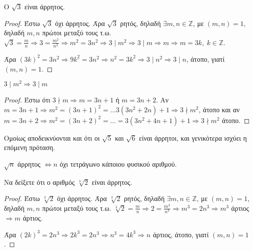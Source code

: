 \begin{example}
  Ο $ \sqrt{3} $ είναι άρρητος.
\end{example}

\begin{proof}
  Έστω $ \sqrt{3} $ όχι άρρητος. Άρα $ \sqrt{3} $ ρητός, δηλαδή $ \exists m,n 
  \in \mathbb{Z} $, με $ (m,n)=1 $, δηλαδή $ m,n $ πρώτοι μεταξύ τους
  τ.ω. $ \sqrt{3} = \frac{m}{n} \Rightarrow 3 = \frac{m^{2}}{n^{2}} \Rightarrow 
  m^{2} = 3n^{2} \Rightarrow 3 \mid m^{2} \Rightarrow 3 \mid m  \Rightarrow m 
  \Rightarrow m = 3k, \; k \in \mathbb{Z}$. 

  Άρα $ (3k)^{2} = 3n^{2} \Rightarrow 9k^{2}=3n^{2} \Rightarrow n^{2} = 3k^{2} 
  \Rightarrow 3 \mid n^{2} \Rightarrow  3 \mid n$,  άτοπο, γιατί $ (m,n)=1 $.
\end{proof}

\begin{lem}
  $ 3 \mid m^{2} \Rightarrow 3 \mid m $
\end{lem}

\begin{proof}
  Έστω ότι $ 3 \nmid m \Rightarrow m = 3n +1 $ ή $ m = 3n+2 $. 
  Αν $ m=3n+1 \Rightarrow m^{2} = (3n+1)^{2} = \ldots 3(3n^{2}+2n)+1 \Rightarrow 
  3 \nmid m^{2}$, άτοπο και αν $ m =3n+2 \Rightarrow m^{2}=(3n+2)^{2} = \ldots = 
  3(3n^{2}+4n+1)+1 \Rightarrow 3 \nmid m^{2}$ άτοπο.
\end{proof}

\begin{rem}
  Ομοίως αποδεικνύονται και ότι οι $ \sqrt{5}$ και  $ \sqrt{6} $ είναι άρρητοι, 
  και γενικότερα ισχύει η επόμενη πρόταση.
\end{rem}

\begin{mybox3}
\begin{prop}
  $ \sqrt{n} $ άρρητος $ \Leftrightarrow n $ όχι τετράγωνο κάποιου φυσικού αριθμού.
\end{prop}
\end{mybox3}

\begin{example}
  Να δείξετε ότι ο αριθμός $ \sqrt[3]{2} $ είναι άρρητος.
\end{example}

\begin{proof}
  Έστω $ \sqrt[3]{2} $ όχι άρρητος. Άρα $ \sqrt[3]{2} $ ρητός, δηλαδή $ \exists m,n 
  \in \mathbb{Z} $, με $ (m,n)=1 $, δηλαδή $ m,n $ πρώτοι μεταξύ τους
  τ.ω. $ \sqrt[3]{2} = \frac{m}{n} \Rightarrow 2 = \frac{m^{3}}{n^{3}} \Rightarrow 
  m^{3} = 2n^{3} \Rightarrow m^{3} $ άρτιος $ \Rightarrow m $ άρτιος. 

  Άρα $ (2k)^{3} = 2n^{3} \Rightarrow 2k^{3}=2n^{3} \Rightarrow n^{3} = 4k^{3} 
  \Rightarrow n $ άρτιος,  άτοπο, γιατί $ (m,n)=1 $.
\end{proof}

